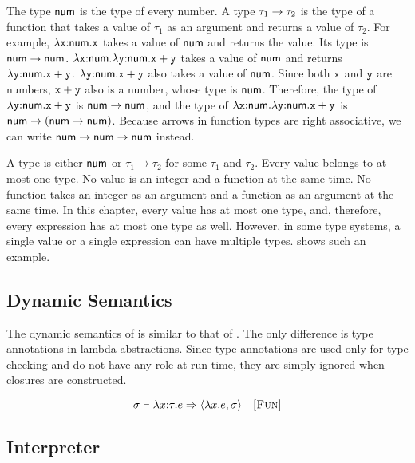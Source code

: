The type $\textsf{num}$ is the type of every number. A type
$\tau_1\rightarrow\tau_2$ is the type of a function that takes a value of
$\tau_1$ as an argument and returns a value of $\tau_2$. For example,
$\lambda\texttt{x}{:}\textsf{num}.\texttt{x}$ takes a value of $\textsf{num}$ and returns the
value. Its type is $\textsf{num}\rightarrow\textsf{num}$.
$\lambda\texttt{x}{:}\textsf{num}.\lambda\texttt{y}{:}\textsf{num}.\texttt{x}+\texttt{y}$ takes a value of
$\textsf{num}$ and returns ${\lambda\texttt{y}{:}\textsf{num}.\texttt{x}+\texttt{y}}$.
${\lambda\texttt{y}{:}\textsf{num}.\texttt{x}+\texttt{y}}$ also takes a value of $\textsf{num}$. Since both $\texttt{x}$
and $\texttt{y}$ are numbers, $\texttt{x}+\texttt{y}$ also is a number, whose type is $\textsf{num}$.
Therefore, the type of ${\lambda\texttt{y}{:}\textsf{num}.\texttt{x}+\texttt{y}}$ is
$\textsf{num}\rightarrow\textsf{num}$, and the type of
$\lambda\texttt{x}{:}\textsf{num}.\lambda\texttt{y}{:}\textsf{num}.\texttt{x}+\texttt{y}$ is
$\textsf{num}\rightarrow(\textsf{num}\rightarrow\textsf{num})$. Because arrows in
function types are right associative, we can write
$\textsf{num}\rightarrow\textsf{num}\rightarrow\textsf{num}$ instead.

A type is either $\textsf{num}$ or $\tau_1\rightarrow\tau_2$ for some $\tau_1$
and $\tau_2$. Every value belongs to at most one type. No value is an integer and a
function at the same time. No function takes an integer as an argument and a
function as an argument at the same time. In this chapter, every value has at most
one type, and, therefore, every expression has at most one type as well. However, in some type
systems, a single value or a single expression can have multiple types.
 shows such an example.

\subsection{Dynamic Semantics}

The dynamic semantics of \Lang is similar to that of \plang. The only difference is
type annotations in lambda abstractions. Since type annotations are used only
for type checking and do not have any role at run time, they are simply ignored
when closures are constructed.


\vspace{-1em}

\[
  \sigma\vdash\lambda x{:}\tau.e\Rightarrow\langle\lambda x.e,\sigma\rangle
  \quad\textsc{[Fun]}
\]

\subsection{Interpreter}

